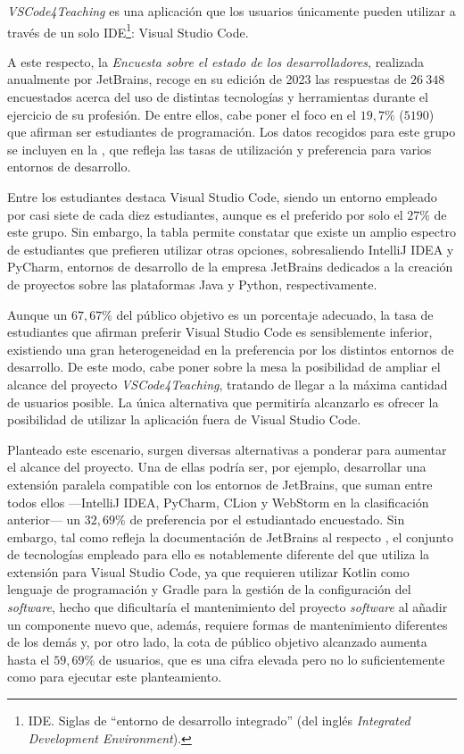 \textit{VSCode4Teaching} es una aplicación que los usuarios únicamente pueden utilizar a través de un solo IDE\footnote{IDE. Siglas de ``entorno de desarrollo integrado'' (del inglés \textit{Integrated Development Environment}).}: Visual Studio Code.

A este respecto, la \textit{Encuesta sobre el estado de los desarrolladores}, realizada anualmente por JetBrains, recoge en su edición de 2023 \cite{JetBrains_DevState} las respuestas de $26\ 348$ encuestados acerca del uso de distintas tecnologías y herramientas durante el ejercicio de su profesión. De entre ellos, cabe poner el foco en el $19,7\%$ ($5190$) que afirman ser estudiantes de programación. Los datos recogidos para este grupo se incluyen en la , que refleja las tasas de utilización y preferencia para varios entornos de desarrollo.



Entre los estudiantes destaca Visual Studio Code, siendo un entorno empleado por casi siete de cada diez estudiantes, aunque es el preferido por solo el $27\%$ de este grupo. Sin embargo, la tabla permite constatar que existe un amplio espectro de estudiantes que prefieren utilizar otras opciones, sobresaliendo IntelliJ IDEA y PyCharm, entornos de desarrollo de la empresa JetBrains dedicados a la creación de proyectos sobre las plataformas Java y Python, respectivamente.

Aunque un $67,67\%$ del público objetivo es un porcentaje adecuado, la tasa de estudiantes que afirman preferir Visual Studio Code es sensiblemente inferior, existiendo una gran heterogeneidad en la preferencia por los distintos entornos de desarrollo. De este modo, cabe poner sobre la mesa la posibilidad de ampliar el alcance del proyecto \textit{VSCode4Teaching}, tratando de llegar a la máxima cantidad de usuarios posible. La única alternativa que permitiría alcanzarlo es ofrecer la posibilidad de utilizar la aplicación fuera de Visual Studio Code.

Planteado este escenario, surgen diversas alternativas a ponderar para aumentar el alcance del proyecto. Una de ellas podría ser, por ejemplo, desarrollar una extensión paralela compatible con los entornos de JetBrains, que suman entre todos ellos ---IntelliJ IDEA, PyCharm, CLion y WebStorm en la clasificación anterior--- un $32,69\%$ de preferencia por el estudiantado encuestado. Sin embargo, tal como refleja la documentación de JetBrains al respecto \cite{JetBrains_Plugins}, el conjunto de tecnologías empleado para ello es notablemente diferente del que utiliza la extensión para Visual Studio Code, ya que requieren utilizar Kotlin como lenguaje de programación y Gradle para la gestión de la configuración del \textit{software}, hecho que dificultaría el mantenimiento del proyecto \textit{software} al añadir un componente nuevo que, además, requiere formas de mantenimiento diferentes de los demás y, por otro lado, la cota de público objetivo alcanzado aumenta hasta el $59,69\%$ de usuarios, que es una cifra elevada pero no lo suficientemente como para ejecutar este planteamiento.

